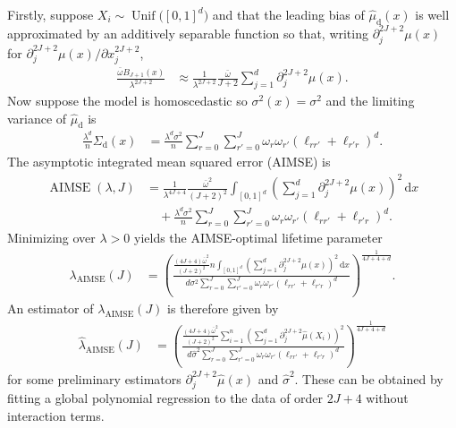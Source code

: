 \documentclass[11pt,lof]{puthesis}
\newcommand{\rd}{\ensuremath{\mathrm{d}}}
\DeclareMathOperator{\AIMSE}{AIMSE}
\DeclareMathOperator{\Unif}{Unif}
\newcommand{\diff}[1]{\,\mathrm{d}#1}
\theoremstyle{break}
\theoremstyle{proof}
\begin{document}
Firstly, suppose $X_i \sim \Unif\big([0,1]^d\big)$
and that the leading bias of $\hat\mu_\rd(x)$ is well approximated by an
additively separable function so that,
writing $\partial^{2 J + 2}_j \mu(x)$
for $\partial^{2 J + 2}_j \mu(x) / \partial x_j^{2 J + 2}$,
%
\begin{align*}
\frac{\bar \omega B_{J+1}(x)}{\lambda^{2 J + 2}}
&\approx
\frac{1}{\lambda^{2 J + 2}}
\frac{\bar \omega }{J + 2}
\sum_{j=1}^d
\partial^{2 J + 2}_j \mu(x).
\end{align*}
%
Now suppose the model is homoscedastic so $\sigma^2(x) = \sigma^2$ and
the limiting variance of $\hat\mu_\rd$ is
%
\begin{align*}
\frac{\lambda^d}{n}
\Sigma_\rd(x)
&=
\frac{\lambda^d \sigma^2}{n}
\sum_{r=0}^{J}
\sum_{r'=0}^{J}
\omega_r
\omega_{r'}
\left( \ell_{r r'} + \ell_{r' r} \right)^d.
\end{align*}
%
The asymptotic integrated mean squared error (AIMSE) is
%
\begin{align*}
\AIMSE(\lambda, J)
&=
\frac{1}{\lambda^{4 J + 4}}
\frac{\bar \omega^2}{(J + 2)^2}
\int_{[0,1]^d}
\left(
\sum_{j=1}^d
\partial^{2 J + 2}_j \mu(x)
\right)^2
\diff x \\
&\quad+
\frac{\lambda^d \sigma^2}{n}
\sum_{r=0}^{J}
\sum_{r'=0}^{J}
\omega_r
\omega_{r'}
\left( \ell_{r r'} + \ell_{r' r} \right)^d.
\end{align*}
%
Minimizing over $\lambda > 0$ yields the AIMSE-optimal lifetime parameter
%
\begin{align*}
\lambda_{\AIMSE}(J)
&=
\left(
\frac{
\frac{(4 J + 4) \bar \omega^2}{(J + 2)^2}
n \int_{[0,1]^d}
\left(
\sum_{j=1}^d
\partial^{2 J + 2}_j \mu(x)
\right)^2
\diff x
}{
d \sigma^2
\sum_{r=0}^{J}
\sum_{r'=0}^{J}
\omega_r
\omega_{r'}
\left( \ell_{r r'} + \ell_{r' r} \right)^d
}
\right)^{\frac{1}{4 J + 4 + d}}.
\end{align*}
%
An estimator of $\lambda_{\AIMSE}(J)$ is therefore given by
%
\begin{align*}
\hat\lambda_{\AIMSE}(J)
&=
\left(
\frac{
\frac{(4 J + 4) \bar \omega^2}{(J + 2)^2}
\sum_{i=1}^n
\left(
\sum_{j=1}^d
\partial^{2 J + 2}_j \hat\mu(X_i)
\right)^2
}{
d \hat\sigma^2
\sum_{r=0}^{J}
\sum_{r'=0}^{J}
\omega_r
\omega_{r'}
\left( \ell_{r r'} + \ell_{r' r} \right)^d
}
\right)^{\frac{1}{4 J + 4 + d}}
\end{align*}
%
for some preliminary estimators
$\partial^{2 J + 2}_j \hat\mu(x)$ and $\hat\sigma^2$.
These can be obtained by fitting a global polynomial regression
to the data of order $2 J + 4$ without interaction terms.
\end{document}
